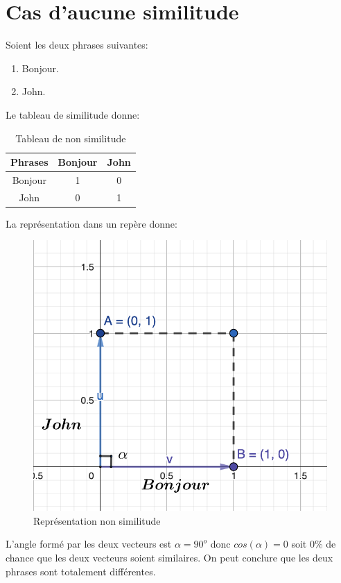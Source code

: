 \documentclass[a4paper, 14pt]{article}
\begin{document}
    \section{Cas d'aucune similitude}
    Soient les deux phrases suivantes:
    \begin{enumerate}
    	\item Bonjour.
    	\item John.
    \end{enumerate}
	Le tableau de similitude donne:
	  \begin{table}[H]
		\centering
		\begin{tabular}{|c|c|c|}
			\hline
			\textbf{Phrases} & \textbf{Bonjour} & \textbf{John} \\
			\hline
			Bonjour & 1 & 0 \\
			John  & 0 & 1 \\
			\hline
		\end{tabular}
		\caption{Tableau de non similitude}
		\label{tab:nonsimilarite}
	\end{table}
	\newpage
	La représentation dans un repère donne:
	\begin{figure}[H]
		\includegraphics[scale=0.5, width=15cm]{./img/vecteur_non_similitude.png}
		\caption{Représentation non similitude}
	\end{figure}
	L'angle formé par les deux vecteurs est $\alpha = 90^{o}$ donc $cos(\alpha) = 0$ soit 0\% de chance que les deux vecteurs soient similaires. On peut conclure que les deux phrases sont totalement différentes.
\end{document}
